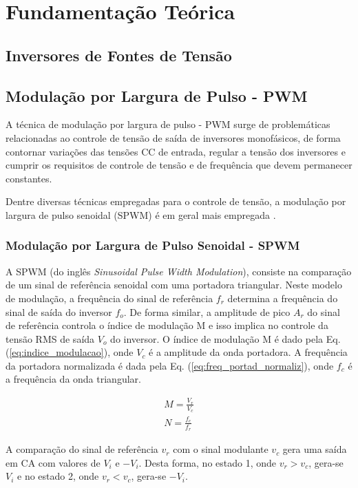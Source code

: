 \chapter{Fundamentação Teórica}

\section{Inversores de Fontes de Tensão}

\section{Modulação por Largura de Pulso - PWM}

A técnica de modulação por largura de pulso - PWM surge de problemáticas relacionadas ao controle de tensão de saída de inversores monofásicos, de forma contornar variações das tensões CC de entrada, regular a tensão dos inversores e cumprir os requisitos de controle de tensão e de frequência que devem permanecer constantes.

Dentre diversas técnicas empregadas para o controle de tensão, a modulação por largura de pulso senoidal (SPWM) é em geral mais empregada \cite{Rashid-Muhammad}.

\subsection{Modulação por Largura de Pulso Senoidal - SPWM}

A SPWM (do inglês \textit{Sinusoidal Pulse Width Modulation}), consiste na comparação de um sinal de referência senoidal com uma portadora triangular. Neste modelo de modulação, a frequência do sinal de referência $f_r$ determina a frequência do sinal de saída do inversor $f_o$. De forma similar, a amplitude de pico $A_r$ do sinal de referência controla o índice de modulação M e isso implica no controle da tensão RMS de saída $V_o$ do inversor. O índice de modulação M é dado pela Eq. (\ref{eq:indice_modulacao}), onde $V_{c}$ é a amplitude da onda portadora. A frequência da portadora normalizada é dada pela Eq. (\ref{eq:freq_portad_normaliz}), onde $f_c$ é a frequência da onda triangular.

\begin{align}
	M = \frac{V_r}{V_{c}} \label{eq:indice_modulacao} \\
	N = \frac{f_c}{f_r} \label{eq:freq_portad_normaliz}	
\end{align}

A comparação do sinal de referência $v_r$ com o sinal modulante $v_c$ gera uma saída em CA com valores de $V_i$ e $-V_i$. Desta forma, no estado 1, onde $v_r > v_c$, gera-se $V_i$ e no estado 2, onde $v_r < v_c$, gera-se $-V_i$. 

